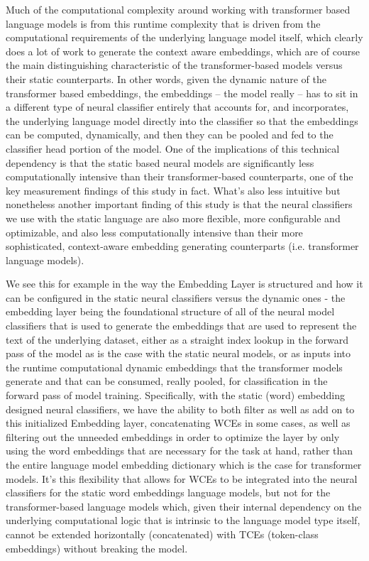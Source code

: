 \documentclass[final]{clv2025}
\begin{document}
Much of the computational complexity around working with transformer based language models is from this runtime complexity that is driven from the computational requirements of the underlying language model itself, which clearly does a lot of work to generate the context aware embeddings, which are of course the main distinguishing characteristic of the transformer-based models versus their static counterparts. In other words, given the dynamic nature of the transformer based embeddings, the embeddings – the model really – has to sit in a different type of neural classifier entirely that accounts for, and incorporates, the underlying language model directly into the classifier so that the embeddings can be computed, dynamically, and then they can be pooled and fed to the classifier head portion of the model. One of the implications of this technical dependency is that the static based neural models are significantly less computationally intensive than their transformer-based counterparts, one of the key measurement findings of this study in fact. What’s also less intuitive but nonetheless another important finding of this study is that the neural classifiers we use with the static language are also more flexible, more configurable and optimizable, and also less computationally intensive than their more sophisticated, context-aware embedding generating counterparts (i.e. transformer language models). 

We see this for example in the way the Embedding Layer is structured and how it can be configured in the static neural classifiers versus the dynamic ones - the embedding layer being the foundational structure of all of the neural model classifiers that is used to generate the embeddings that are used to represent the text of the underlying dataset, either as a straight index lookup in the forward pass of the model as is the case with the static neural models, or as inputs into the runtime computational dynamic embeddings that the transformer models generate and that can be consumed, really pooled, for classification in the forward pass of model training. Specifically, with the static (word) embedding designed neural classifiers, we have the ability to both filter as well as add on to this initialized Embedding layer, concatenating WCEs in some cases, as well as filtering out the unneeded embeddings in order to optimize the layer by only using the word embeddings that are necessary for the task at hand, rather than the entire language model embedding dictionary which is the case for transformer models. It’s this flexibility that allows for WCEs to be integrated into the neural classifiers for the static word embeddings language models, but not for the transformer-based language models which, given their internal dependency on the underlying computational logic that is intrinsic to the language model type itself, cannot be extended horizontally (concatenated) with TCEs (token-class embeddings) without breaking the model.
\end{document}
